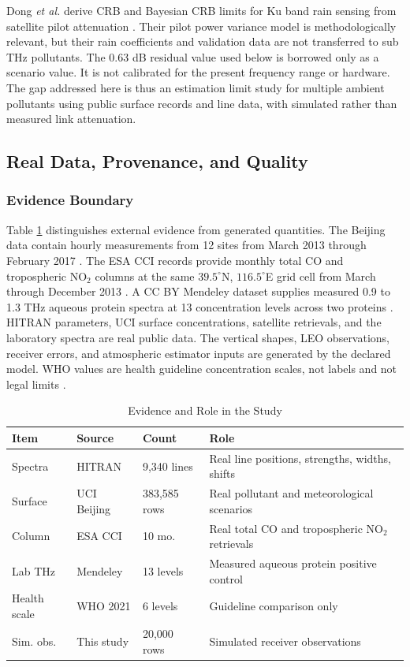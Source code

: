 \documentclass[conference]{IEEEtran}
\begin{document}
Dong \emph{et al.} derive CRB and Bayesian CRB limits for Ku band rain sensing from satellite pilot attenuation \cite{dong2026rain}. Their pilot power variance model is methodologically relevant, but their rain coefficients and validation data are not transferred to sub THz pollutants. The 0.63 dB residual value used below is borrowed only as a scenario value. It is not calibrated for the present frequency range or hardware. The gap addressed here is thus an estimation limit study for multiple ambient pollutants using public surface records and line data, with simulated rather than measured link attenuation.

\subsection{Real Data, Provenance, and Quality}

\subsubsection{Evidence Boundary}

Table \ref{tab:evidence} distinguishes external evidence from generated quantities. The Beijing data contain hourly measurements from 12 sites from March 2013 through February 2017 \cite{chen2017beijing}. The ESA CCI records provide monthly total CO and tropospheric NO$_2$ columns at the same $39.5^\circ$N, $116.5^\circ$E grid cell from March through December 2013 \cite{esacciCO,esacciNO2}. A CC BY Mendeley dataset supplies measured 0.9 to 1.3 THz aqueous protein spectra at 13 concentration levels across two proteins \cite{hattori2024data}. HITRAN parameters, UCI surface concentrations, satellite retrievals, and the laboratory spectra are real public data. The vertical shapes, LEO observations, receiver errors, and atmospheric estimator inputs are generated by the declared model. WHO values are health guideline concentration scales, not labels and not legal limits \cite{who2021aqg}.

\begin{table}[t]
\caption{Evidence and Role in the Study}
\label{tab:evidence}
\centering
\scriptsize
\setlength{\tabcolsep}{2.0pt}
\begin{tabular}{@{}p{0.95cm}p{1.35cm}p{0.96cm}p{2.99cm}@{}}
\toprule
Item & Source & Count & Role \\
\midrule
Spectra & HITRAN & 9,340 lines & Real line positions, strengths, widths, shifts \\
Surface & UCI Beijing & 383,585 rows & Real pollutant and meteorological scenarios \\
Column & ESA CCI & 10 mo. & Real total CO and tropospheric NO$_2$ retrievals \\
Lab THz & Mendeley & 13 levels & Measured aqueous protein positive control \\
Health scale & WHO 2021 & 6 levels & Guideline comparison only \\
Sim. obs. & This study & 20,000 rows & Simulated receiver observations \\
\bottomrule
\end{tabular}
\end{table}
\end{document}
